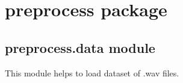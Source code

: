 \documentclass[letterpaper,10pt,english,openany,oneside]{sphinxmanual}
\begin{document}
\chapter{preprocess package}
\label{\detokenize{docs/source/preprocess:preprocess-package}}\label{\detokenize{docs/source/preprocess::doc}}

\section{preprocess.data module}
\label{\detokenize{docs/source/preprocess:module-preprocess.data}}\label{\detokenize{docs/source/preprocess:preprocess-data-module}}
This module helps to load dataset of .wav files.
\end{document}
